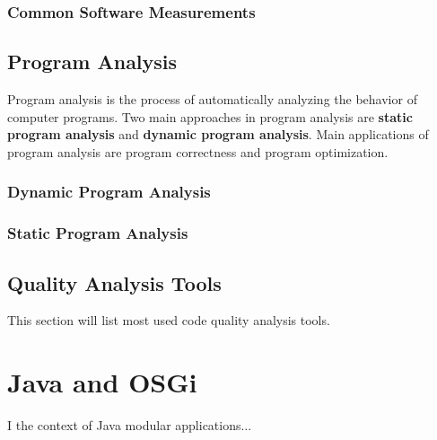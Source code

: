 \subsubsection{Common Software Measurements}

\subsection{Program Analysis}
Program analysis is the process of automatically analyzing the behavior of computer programs. Two main approaches in program analysis are \textbf{static program analysis} and \textbf{dynamic program analysis}. Main applications of program analysis are program correctness and program optimization.
\subsubsection{Dynamic Program Analysis}
\subsubsection{Static Program Analysis}

\subsection{Quality Analysis Tools}
This section will list most used code quality analysis tools.

\section{Java and OSGi}
I the context of Java modular applications...
